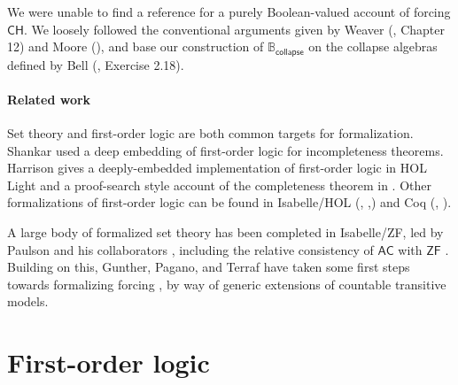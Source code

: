 \documentclass[sigplan,10pt,review]{acmart}
\newcommand{\CH}{\mathsf{CH}}
\theoremstyle{definition}
\begin{document}
We were unable to find a reference for a purely Boolean-valued account of forcing \(\CH\). We loosely followed the conventional arguments given by Weaver (\cite{weaver2014forcing}, Chapter 12) and Moore (\cite{moore2019method}), and base our construction of \(\mathbb{B}_{\mathsf{collapse}}\) on the collapse algebras defined by Bell (\cite{bell2011set}, Exercise 2.18).

\paragraph{Related work} Set theory and first-order logic are both common targets for formalization. Shankar \cite{shankar1997metamathematics} used a deep embedding of first-order logic for incompleteness theorems. Harrison gives a deeply-embedded implementation of first-order logic in HOL Light \cite{harrison1998formalizing} and a proof-search style account of the completeness theorem in \cite{harrison2009handbook}. Other formalizations of first-order logic can be found in Isabelle/HOL (\cite{Ridge2005AMV}, \cite{schlichtkrull2018formalization},\cite{FOL-Fitting-AFP}) and Coq (\cite{ilik2010constructive}, \cite{DBLP:conf/tphol/OConnor05}).

A large body of formalized set theory has been completed in Isabelle/ZF, led by Paulson and his collaborators \cite{paulson1996mechanizing, paulson1993set, paulson2002reflection}, including the relative consistency of \(\mathsf{AC}\) with $\mathsf{ZF}$ \cite{paulson2008relative}. Building on this, Gunther, Pagano, and Terraf have taken some first steps towards formalizing forcing \cite{gunther2018first, gunther2019mechanization}, by way of generic extensions of countable transitive models.



\section{First-order logic}
\label{sect:fol}
\end{document}
